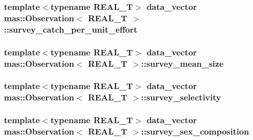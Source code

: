 \subsubsection[{survey\+\_\+catch\+\_\+per\+\_\+unit\+\_\+effort}]{\setlength{\rightskip}{0pt plus 5cm}template$<$typename R\+E\+A\+L\+\_\+\+T$>$ data\+\_\+vector {\bf mas\+::\+Observation}$<$ R\+E\+A\+L\+\_\+\+T $>$\+::survey\+\_\+catch\+\_\+per\+\_\+unit\+\_\+effort}\label{classmas_1_1_observation_ad5abe789449f80832b9c22a6eac937bc}
\hypertarget{classmas_1_1_observation_a3b7e3e8811a2ecec799c4d55b8ab48be}{}
\subsubsection[{survey\+\_\+mean\+\_\+size}]{\setlength{\rightskip}{0pt plus 5cm}template$<$typename R\+E\+A\+L\+\_\+\+T$>$ data\+\_\+vector {\bf mas\+::\+Observation}$<$ R\+E\+A\+L\+\_\+\+T $>$\+::survey\+\_\+mean\+\_\+size}\label{classmas_1_1_observation_a3b7e3e8811a2ecec799c4d55b8ab48be}
\hypertarget{classmas_1_1_observation_a84b4905765c885a64cad087c157d8c21}{}
\subsubsection[{survey\+\_\+selectivity}]{\setlength{\rightskip}{0pt plus 5cm}template$<$typename R\+E\+A\+L\+\_\+\+T$>$ data\+\_\+vector {\bf mas\+::\+Observation}$<$ R\+E\+A\+L\+\_\+\+T $>$\+::survey\+\_\+selectivity}\label{classmas_1_1_observation_a84b4905765c885a64cad087c157d8c21}
\hypertarget{classmas_1_1_observation_a162ad2d12da0f248d1d5f4f360c907e2}{}
\subsubsection[{survey\+\_\+sex\+\_\+composition}]{\setlength{\rightskip}{0pt plus 5cm}template$<$typename R\+E\+A\+L\+\_\+\+T$>$ data\+\_\+vector {\bf mas\+::\+Observation}$<$ R\+E\+A\+L\+\_\+\+T $>$\+::survey\+\_\+sex\+\_\+composition}\label{classmas_1_1_observation_a162ad2d12da0f248d1d5f4f360c907e2}
\hypertarget{classmas_1_1_observation_a560882c02800a3157afa3d62ca3bbf98}{}
